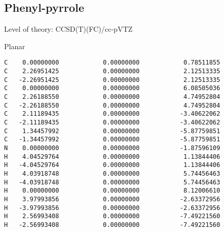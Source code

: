 \documentclass[journal=jctcce,manuscript=article,layout=traditional]{achemso}
\newcommand{\TZ}{cc-pVTZ}
\begin{document}
\subsection*{Phenyl-pyrrole}

\begin{singlespace}
Level of theory: CCSD(T)(FC)/{\TZ}
\end{singlespace}

\begin{singlespace}
\noindent Planar
\begin{verbatim}
C    0.00000000            0.00000000            0.78511855
C    2.26951425            0.00000000            2.12513335
C   -2.26951425            0.00000000            2.12513335
C    0.00000000            0.00000000            6.08505036
C    2.26188550            0.00000000            4.74952804
C   -2.26188550            0.00000000            4.74952804
C    2.11189435            0.00000000           -3.40622062
C   -2.11189435            0.00000000           -3.40622062
C    1.34457992            0.00000000           -5.87759851
C   -1.34457992            0.00000000           -5.87759851
N    0.00000000            0.00000000           -1.87596109
H    4.04529764            0.00000000            1.13844406
H   -4.04529764            0.00000000            1.13844406
H    4.03918748            0.00000000            5.74456463
H   -4.03918748            0.00000000            5.74456463
H    0.00000000            0.00000000            8.12006610
H    3.97993856            0.00000000           -2.63372956
H   -3.97993856            0.00000000           -2.63372956
H    2.56993408            0.00000000           -7.49221560
H   -2.56993408            0.00000000           -7.49221560
\end{verbatim}
\end{singlespace}
\end{document}
